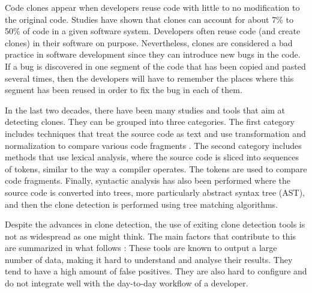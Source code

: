 \documentclass[conference]{IEEEtran}
\begin{document}
Code clones appear when developers reuse code with little to no modification to the original code.
Studies have shown  that clones can account for about 7\% to 50\% of code in a given software system\cite{Baker, StephaneDucasse}.
Developers often reuse code (and create clones) in their software on purpose\cite{Kim2005}.
Nevertheless, clones are considered a bad practice in software development since they can introduce new bugs in the code\cite{Kapser2006,Juergens2009,Li2006}. If a  bug is discovered in one segment of the code that has been copied and pasted several times, then the developers will have to remember the places where this segment has been reused in order to fix the bug in each of them.

In the last two decades, there have been many studies and tools that aim at detecting clones. They can be grouped into three categories. The first category includes techniques that treat the source code as text and use transformation and normalization  to compare various code fragments \cite{Johnson1994,Johnson1993, Cordy2011, Roy2008}. The second category includes methods that
use lexical analysis, where the source code is sliced into sequences of tokens, similar to the way a compiler operates\cite{Baker,Bakera,Baker2002,Kamiya2002,Li2006}. The tokens are used to compare code fragments. Finally, syntactic analysis has also been performed where the source code is converted into trees, more particularly abstract syntax tree (AST), and then the clone detection is performed using tree matching algorithms\cite{Baxter1998, Komondoor2000, Tairas2006, Falke2008}.

Despite the advances in clone detection, the use of exiting clone detection tools is not as widespread as one might think. The main factors that contribute to this are summarized in what follows \cite{Johnson2013}: These tools are known to output a large number of data, making it hard to understand and analyse their results. They tend to have a high amount of false positives.
They are also hard to configure and do not integrate well with the day-to-day workflow of a developer.
\end{document}
